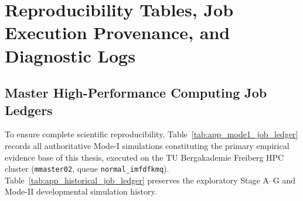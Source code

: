\chapter{Reproducibility Tables, Job Execution Provenance, and Diagnostic Logs}
\label{chap:reproducibility_appendix}

\section{Master High-Performance Computing Job Ledgers}
\label{sec:app_job_ledger}

To ensure complete scientific reproducibility, Table~\ref{tab:app_mode1_job_ledger} records all authoritative Mode-I simulations constituting the primary empirical evidence base of this thesis, executed on the TU Bergakademie Freiberg HPC cluster (\texttt{mmaster02}, queue \texttt{normal\_imfdfkmq}). Table~\ref{tab:app_historical_job_ledger} preserves the exploratory Stage A--G and Mode-II developmental simulation history.

